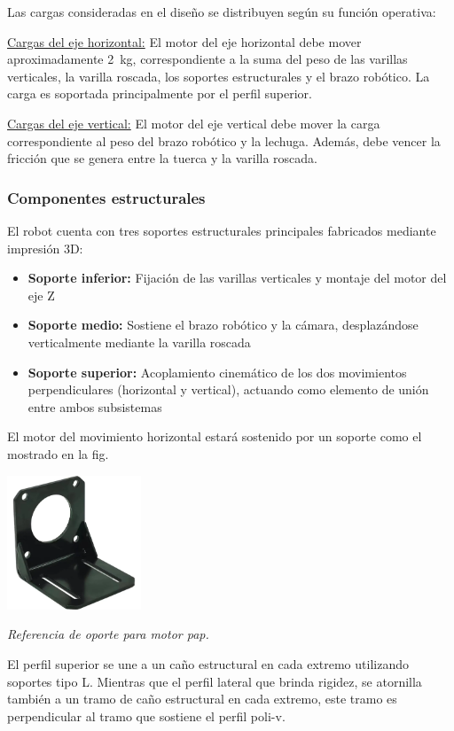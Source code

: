 Las cargas consideradas en el diseño se distribuyen según su función operativa:

\underline{Cargas del eje horizontal:}
El motor del eje horizontal debe mover aproximadamente 2~kg, correspondiente a la suma del peso de las varillas verticales, la varilla roscada, los soportes estructurales y el brazo robótico. La carga es soportada principalmente por el perfil superior.

\underline{Cargas del eje vertical:}
El motor del eje vertical debe mover la carga correspondiente al peso del brazo robótico y la lechuga. Además, debe vencer la fricción que se genera entre la tuerca y la varilla roscada.

\subsubsection{Componentes estructurales}

El robot cuenta con tres soportes estructurales principales fabricados mediante impresión 3D:

\begin{itemize}[label=$\bullet$]
    \item \textbf{Soporte inferior:} Fijación de las varillas verticales y montaje del motor del eje Z
    \item \textbf{Soporte medio:} Sostiene el brazo robótico y la cámara, desplazándose verticalmente mediante la varilla roscada
    \item \textbf{Soporte superior:} Acoplamiento cinemático de los dos movimientos perpendiculares (horizontal y vertical), actuando como elemento de unión entre ambos subsistemas
\end{itemize}

El motor del movimiento horizontal estará sostenido por un soporte como el mostrado en la fig.
\begin{table}[h]
\centering
\includegraphics[width=0.3\textwidth]{img/soporte_motor_pap.png}
\caption{\textit{Referencia de oporte para motor pap.}}
\label{fig:soporte_motor_pap}
\end{table}
El perfil superior se une a un caño estructural en cada extremo utilizando soportes tipo L. Mientras que el perfil lateral que brinda rigidez, se atornilla también a un tramo de caño estructural en cada extremo, este tramo es perpendicular al tramo que sostiene el perfil poli-v.